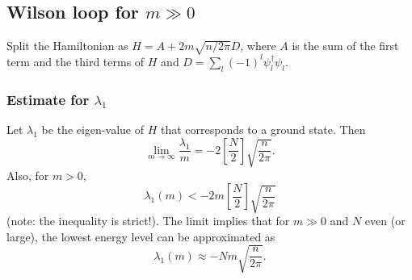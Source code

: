 \subsection{Wilson loop for $m \gg 0$}
Split the Hamiltonian as $H = A + 2m\sqrt{n/2\pi} D$, where $A$ is the sum of the first term and the third terms of $H$ and $D = \sum_l (-1)^l \psi_l^\dagger \psi_l$.

\subsubsection{Estimate for $\lambda_1$}
\begin{proposition}\label{p:lambda_est_pos}
Let $\lambda_1$ be the eigen-value of $H$ that corresponds to a ground state. Then
\[
\lim_{m \rightarrow \infty} \frac{\lambda_1}{m} = -2\left[\frac{N}{2}\right]\sqrt{\frac{n}{2\pi}}.
\]
Also, for $m > 0$,
\[
\lambda_1(m) < -2m\left[\frac{N}{2}\right]\sqrt{\frac{n}{2\pi}}
\]
(note: the inequality is strict!). The limit implies that for $m \gg 0$ and $N$ even (or large), the lowest energy level can be approximated as 
\[
\lambda_1(m) \approx - Nm \sqrt{\frac{n}{2\pi}}.
\]
\end{proposition}
